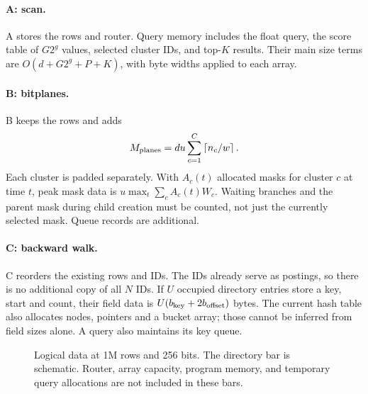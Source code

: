 \paragraph{A: scan.} A stores the rows and router. Query memory includes the float query,
the score table of $G2^g$ values, selected cluster IDs, and top-$K$ results. Their main size
terms are $O(d+G2^g+P+K)$, with byte widths applied to each array.

\paragraph{B: bitplanes.} B keeps the rows and adds
\begin{equation}
 M_{\rm planes}=du\sum_{c=1}^{C}\left\lceil n_c/w\right\rceil.
 \label{eq:planes}
\end{equation}
Each cluster is padded separately. With $A_c(t)$ allocated masks for cluster $c$ at time $t$,
peak mask data is $u\max_t\sum_c A_c(t)W_c$. Waiting branches and the parent mask during child
creation must be counted, not just the currently selected mask. Queue records are additional.

\paragraph{C: backward walk.} C reorders the existing rows and IDs. The IDs already serve
as postings, so there is no additional copy of all $N$ IDs. If $U$ occupied directory entries
store a key, start and count, their field data is $U(b_{\rm key}+2b_{\rm offset})$ bytes.
The current hash table also allocates nodes, pointers and a bucket array; those cannot be
inferred from field sizes alone. A query also maintains its key queue.

\begin{figure}[H]\centering
{}
\caption{Logical data at 1M rows and 256 bits. The directory bar is schematic. Router, array
capacity, program memory, and temporary query allocations are not included in these bars.}
\end{figure}

